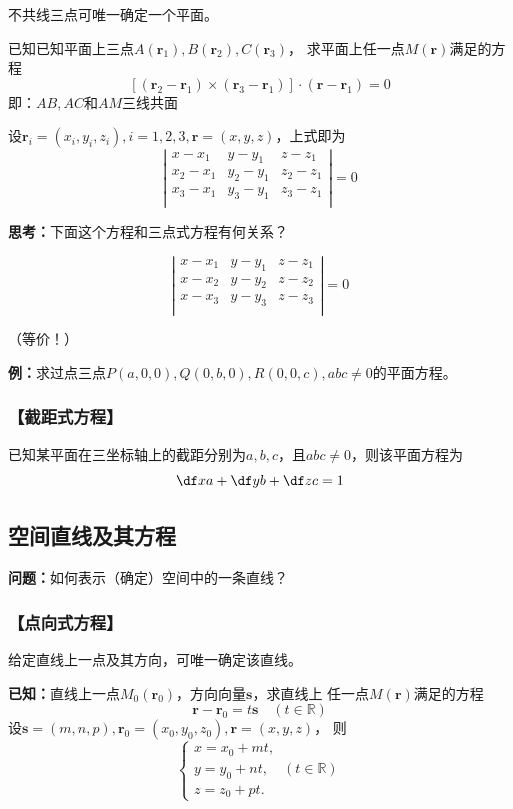 不共线三点可唯一确定一个平面。

已知已知平面上三点$A(\bm{r}_1),B(\bm{r}_2),C(\bm{r}_3)$，
求平面上任一点$M(\bm{r})$满足的方程
$$[(\bm{r}_2-\bm{r}_1)\times(\bm{r}_3-\bm{r}_1)]\cdot(\bm{r}-\bm{r}_1)=0$$
即：$AB,AC$和$AM$三线共面

设$\bm{r}_i=(x_i,y_i,z_i),i=1,2,3,\bm{r}=(x,y,z)$，上式即为
$$\left|\begin{array}{ccc}
x-x_1 & y-y_1 & z-z_1\\
x_2-x_1 & y_2-y_1 & z_2-z_1\\
x_3-x_1 & y_3-y_1 & z_3-z_1\\
\end{array}\right|
=0
$$

{\bf 思考：}下面这个方程和三点式方程有何关系？

$$\left|\begin{array}{ccc}
x-x_1 & y-y_1 & z-z_1\\
x-x_2 & y-y_2 & z-z_2\\
x-x_3 & y-y_3 & z-z_3\\
\end{array}\right|
=0
$$

\hfill （等价！）
 
{\bf 例：}求过点三点$P(a,0,0),Q(0,b,0),R(0,0,c),abc\ne0$的平面方程。

\subsubsection{【截距式方程】}

已知某平面在三坐标轴上的截距分别为$a,b,c$，且$abc\ne 0$，则该平面方程为
$$\df xa+\df yb+\df zc=1$$

\subsection{空间直线及其方程}

{\bf 问题：}如何表示（确定）空间中的一条直线？

\subsubsection{【点向式方程】}

给定直线上一点及其方向，可唯一确定该直线。

{\bf 已知：}直线上一点$M_0(\bm{r}_0)$，方向向量$\bm{s}$，求直线上
任一点$M(\bm{r})$满足的方程 
$${\bm{r}-\bm{r}_0=t\bm{s}\quad(t\in\mathbb{R})}$$ 
设$\bm{s}=(m,n,p),\bm{r}_0=(x_0,y_0,z_0),\bm{r}=(x,y,z)$， 则
$$
	{\left\{\begin{array}{l}
		x=x_0+mt,\\
		y=y_0+nt,\quad (t\in\mathbb{R})\\
		z=z_0+pt.
	\end{array}\right.}
$$

